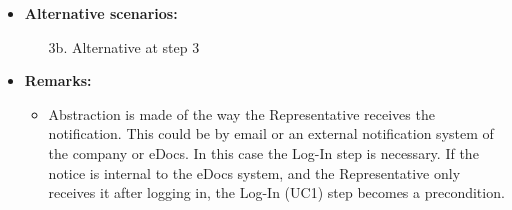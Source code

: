 \documentclass[a4paper,10pt]{article}
\begin{document}
\begin{itemize}
    \item \textbf{Alternative scenarios:} 
    \begin{enumerate}
        \item [3b.] Alternative at step 3
    \end{enumerate}
    
    \item \textbf{Remarks:}
        \begin{itemize}
            \item Abstraction is made of the way the Representative receives the notification. This could be by email or an external notification system of the company or eDocs. In this case the Log-In step is necessary. If the notice is internal to the eDocs system, and the Representative only receives it after logging in, the Log-In (UC1) step becomes a precondition.
        \end{itemize}
\end{itemize}
\end{document}
